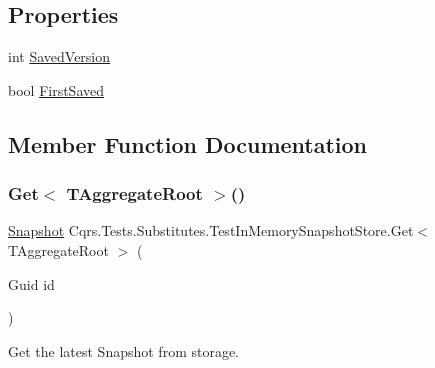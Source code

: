\subsection*{Properties}
\begin{DoxyCompactItemize}
\item 
int \hyperlink{classCqrs_1_1Tests_1_1Substitutes_1_1TestInMemorySnapshotStore_a9924a25c49a5aca8fa2f29ca84ad0d11_a9924a25c49a5aca8fa2f29ca84ad0d11}{Saved\+Version}
\item 
bool \hyperlink{classCqrs_1_1Tests_1_1Substitutes_1_1TestInMemorySnapshotStore_a8e78ba4aad268910f35df0eb083d9883_a8e78ba4aad268910f35df0eb083d9883}{First\+Saved}
\end{DoxyCompactItemize}


\subsection{Member Function Documentation}
\mbox{\label{classCqrs_1_1Tests_1_1Substitutes_1_1TestInMemorySnapshotStore_a8600a3211dd09e9fe2e2292a031f0d47_a8600a3211dd09e9fe2e2292a031f0d47}} 
\subsubsection{\texorpdfstring{Get$<$ T\+Aggregate\+Root $>$()}{Get< TAggregateRoot >()}}
{\footnotesize\ttfamily \hyperlink{classCqrs_1_1Snapshots_1_1Snapshot}{Snapshot} Cqrs.\+Tests.\+Substitutes.\+Test\+In\+Memory\+Snapshot\+Store.\+Get$<$ T\+Aggregate\+Root $>$ (\begin{DoxyParamCaption}\item[{Guid}]{id }\end{DoxyParamCaption})}



Get the latest Snapshot from storage. 


